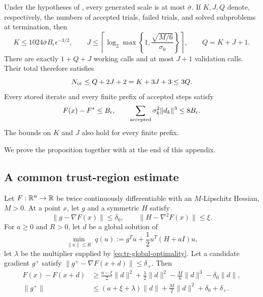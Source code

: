 \documentclass{article}
\begin{document}
\begin{proposition}\label{prop:utr-budgets}
Under the hypotheses of , every generated
scale is at most $\bar\sigma$.  If $K,J,Q$ denote, respectively,
the numbers of accepted trials, failed trials, and solved
subproblems at termination, then
\begin{equation}\label{eq:utr-counts}
 K\le1024\bar\sigma B_\epsilon\epsilon^{-3/2},\qquad
 J\le\left\lceil\log_2\max\left\{1,
          \frac{\sqrt{M/6}}{\sigma_0}\right\}\right\rceil,
 \qquad Q=K+J+1.
\end{equation}
There are exactly $1+Q+J$ working calls and at most $J+1$ validation
calls.  Their total therefore satisfies
\begin{equation}\label{eq:utr-query-count}
 N_{\rm or}\le Q+2J+2=K+3J+3\le3Q.
\end{equation}
Every stored iterate and
every finite prefix of accepted steps satisfy
\begin{equation}\label{eq:utr-path-budget}
 F(x)-F^*\le B_\epsilon,\qquad
 \sum_{\rm accepted}\sigma_k^2\|d_k\|^3\le8B_\epsilon.
\end{equation}
The bounds on $K$ and $J$ also hold for every finite prefix.
\end{proposition}

We prove the proposition together with 
at the end of this appendix.

\subsection{A common trust-region estimate}
\label{app:common-tr-estimate}

\begin{lemma}
\label{lem:common-inexact-tr-step}
Let $F:\mathbb{R}^n\to\mathbb{R}$ be twice continuously differentiable with an
$M$-Lipschitz Hessian, $M>0$.  At a point $x$, let $g$ and a
symmetric $H$ satisfy
\[
 \|g-\nabla F(x)\|\le\delta_0,
 \qquad
 \|H-\nabla^2F(x)\|\le\xi.
\]
For $a\ge0$ and $R>0$, let $d$ be a global solution of
\[
 \min_{\|u\|\le R}\;
 q(u):=g^Tu+\frac12u^T(H+aI)u,
\]
let $\lambda$ be the multiplier supplied by
\eqref{eq:tr-global-optimality}.  Let a candidate
gradient $g^+$ satisfy
$\|g^+-\nabla F(x+d)\|\le\delta_+$.  Then
\begin{subequations}\label{eq:common-tr-estimates}
\begin{align}
 F(x)-F(x+d)
 &\ge\frac{a-\xi}{2}\|d\|^2+\frac{\lambda}{2}\|d\|^2
      -\frac M6\|d\|^3-\delta_0\|d\|,
       \label{eq:common-function-bound}\\
 \|g^+\|
 &\le(a+\xi+\lambda)\|d\|+\frac M2\|d\|^2+\delta_0+\delta_+.
       \label{eq:common-gradient-bound}
\end{align}
\end{subequations}
\end{lemma}
\end{document}
